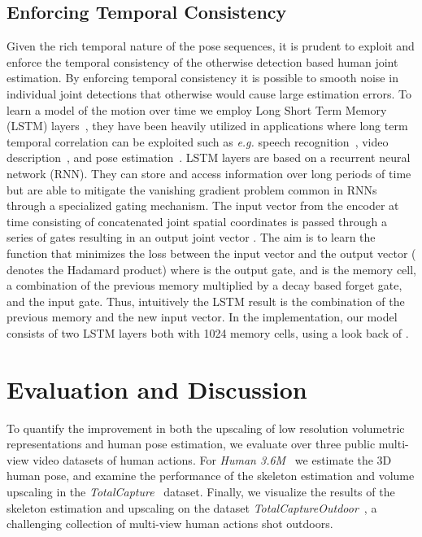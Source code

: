 \documentclass[runningheads]{llncs}
\begin{document}
\subsection {Enforcing Temporal Consistency}
\label{sec:LSTM}
Given the rich temporal nature of the pose sequences, it is prudent to exploit and enforce the temporal consistency of the otherwise detection based human joint estimation. By enforcing temporal consistency it is possible to smooth noise in individual joint detections that otherwise would cause large estimation errors. To learn a model of the motion over time we employ Long Short Term Memory (LSTM) layers~\cite{hochreiter1997LSTM}, they have been heavily utilized in applications where long term temporal correlation can be exploited such as \emph{e.g.} speech recognition~\cite{sak2014lstmSpeech}, video description~\cite{donahue2015lstmVideo}, and pose estimation~\cite{luo2017lstm}. LSTM layers are based on a  recurrent neural network (RNN). They can store and access information over long periods of time but are able to mitigate the vanishing gradient problem common in RNNs through a specialized gating mechanism. The input vector from the encoder  at time  consisting of concatenated joint spatial coordinates is passed through a series of gates resulting in an output joint vector . The aim is to learn the function that minimizes the loss between the input vector and the output vector  (  denotes the Hadamard product) where  is the output gate, and  is the memory cell, a combination of the previous memory  multiplied by a decay based forget gate, and the input gate. Thus, intuitively the LSTM result is the combination of the previous memory and the new input vector. In the implementation, our model consists of two LSTM layers both with 1024 memory cells, using a look back of . 

\section{Evaluation and Discussion}
\label{sec:Eval}
To quantify the improvement in both the upscaling of low resolution volumetric representations and human pose estimation, we evaluate over three public multi-view video datasets of human actions. For \emph{Human 3.6M}~\cite{h36m_pami} we estimate the 3D human pose, and examine the performance of the skeleton estimation and volume upscaling in the \emph{TotalCapture}~\cite{trumble_total_2017} dataset. Finally, we visualize the results of the skeleton estimation and upscaling on the dataset \emph{TotalCaptureOutdoor}~\cite{Malleson:3DV:2017}, a challenging collection of multi-view human actions shot outdoors.
\end{document}
